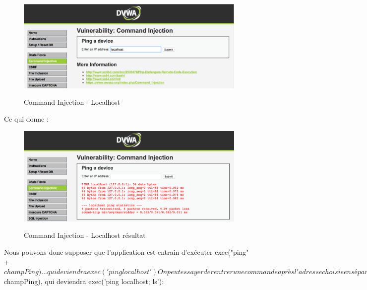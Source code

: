 \begin{figure}[!h]
\begin{center}

\label{inclusion}
\includegraphics[scale=0.5]{images/bf2.png}

\caption{Command Injection - Localhost}

\end{center}
\end{figure}

Ce qui donne :

\begin{figure}[!h]
\begin{center}

\label{inclusion}
\includegraphics[scale=0.5]{images/bf3.png}

\caption{Command Injection - Localhost résultat}

\end{center}
\end{figure}

Nous pouvons donc supposer que l'application est entrain d'exécuter exec("ping" +$champPing)...qui deviendraexec('ping localhost')
On peut essayer de rentrer une commande après l'adresse choisie en séparant celles-ci d'un ';'. Par exemple, en rentrant la commande 'localhost ; ls', on obtient exec('ping'+ $champPing), qui deviendra exec('ping localhost; ls'):


